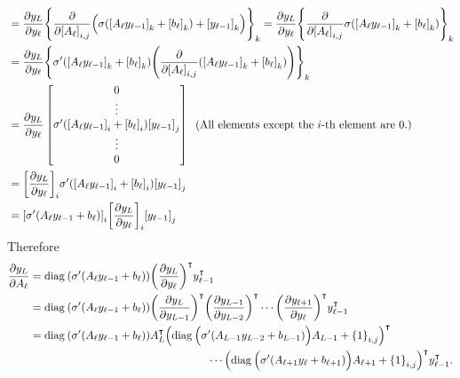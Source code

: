 \documentclass[10pt]{article}
\begin{document}
\begin{enumerate}[(1), leftmargin=*]
\begin{align*}
        &= \frac{\partial y_L}{\partial y_\ell}\qty{\frac{\partial}{\partial \qty[A_\ell]_{i, j}}\Big(\sigma\qty(\qty[A_\ell y_{\ell-1}]_k + \qty[b_\ell]_k) + \qty[y_{\ell-1}]_k\Big)}_{k} = \frac{\partial y_L}{\partial y_\ell}\qty{\frac{\partial}{\partial \qty[A_\ell]_{i, j}}\sigma\qty(\qty[A_\ell y_{\ell-1}]_k + \qty[b_\ell]_k)}_{k} \\
        &= \frac{\partial y_L}{\partial y_\ell}\qty{\sigma'\qty(\qty[A_\ell y_{\ell-1}]_k + \qty[b_\ell]_k)\qty(\frac{\partial}{\partial \qty[A_\ell]_{i, j}}\qty(\qty[A_\ell y_{\ell-1}]_k + \qty[b_\ell]_k))}_{k} \\
        &= \frac{\partial y_L}{\partial y_\ell}\begin{bmatrix}
            0 \\ \vdots \\ {\sigma'\qty(\qty[A_\ell y_{\ell-1}]_i + \qty[b_\ell]_i)\qty[y_{\ell - 1}]_j} \\ \vdots \\ 0
        \end{bmatrix} \;\; (\text{All elements except the } i \text{-th element are }0.)\\
        &= \qty[\frac{\partial y_L}{\partial y_\ell}]_{i}\sigma'\qty(\qty[A_\ell y_{\ell-1}]_i + \qty[b_\ell]_i)\qty[y_{\ell - 1}]_j \\
        &= \qty[\sigma'\qty(A_\ell y_{\ell-1} + b_\ell)]_i\qty[\frac{\partial y_L}{\partial y_\ell}]_{i}\qty[y_{\ell - 1}]_j
    \end{align*}
    Therefore
    \begin{align*}
        \frac{\partial y_L}{\partial A_\ell} &= \text{diag}\:\qty(\sigma'\qty(A_\ell y_{\ell-1} + b_\ell))\qty(\dfrac{\partial y_L}{\partial y_\ell})^\intercal y_{\ell-1}^\intercal \\
        &= \text{diag}\:\qty(\sigma'\qty(A_\ell y_{\ell-1} + b_\ell))\qty(\dfrac{\partial y_L}{\partial y_{L-1}})^\intercal\qty(\dfrac{\partial y_{L-1}}{\partial y_{L-2}})^\intercal\cdots\qty(\dfrac{\partial y_{\ell+1}}{\partial y_\ell})^\intercal y_{\ell-1}^\intercal \\
        &= \text{diag}\:\qty(\sigma'\qty(A_\ell y_{\ell-1} + b_\ell))A_L^\intercal\qty(\text{diag}\:\Big(\sigma'\qty(A_{L-1} y_{L-2} + b_{L-1})\Big) A_{L-1} + \qty{1}_{i, j})^\intercal \\
        &\;\;\;\;\;\;\;\;\;\;\;\;\;\;\;\;\;\;\;\;\;\;\;\;\;\;\;\;\;\;\;\;\;\;\;\;\;\;\;\;\;\;\;\;\;\;\;\;\;\;\;\;\;\;\;\;\;\;\cdots\qty(\text{diag}\:\Big(\sigma'\qty(A_{\ell+1} y_{\ell} + b_{\ell+1})\Big) A_{\ell+1} + \qty{1}_{i, j})^\intercal y_{\ell-1}^\intercal. \\

\end{align*}
\end{enumerate}
\end{document}
